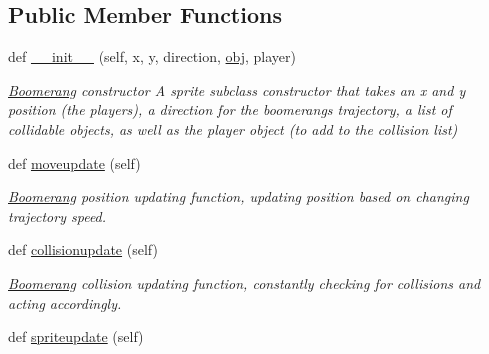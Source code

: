 \subsection*{Public Member Functions}
\begin{DoxyCompactItemize}
\item 
def \hyperlink{classactor_1_1boomerang_1_1_boomerang_a7b20570fa9c54aaba3623075f99770f1}{\+\_\+\+\_\+init\+\_\+\+\_\+} (self, x, y, direction, \hyperlink{classactor_1_1boomerang_1_1_boomerang_a3f28b182298ed6f753bbaa2bacc50287}{obj}, player)
\begin{DoxyCompactList}\small\item\em \hyperlink{classactor_1_1boomerang_1_1_boomerang}{Boomerang} constructor  A sprite subclass constructor that takes an x and y position (the players), a direction for the boomerang\textquotesingle{}s trajectory, a list of collidable objects, as well as the player object (to add to the collision list) \end{DoxyCompactList}\item 
\mbox{\label{classactor_1_1boomerang_1_1_boomerang_a5a0f0c1b4d25b5fa10ecb7b02a4f6b5e}} 
def \hyperlink{classactor_1_1boomerang_1_1_boomerang_a5a0f0c1b4d25b5fa10ecb7b02a4f6b5e}{moveupdate} (self)
\begin{DoxyCompactList}\small\item\em \hyperlink{classactor_1_1boomerang_1_1_boomerang}{Boomerang} position updating function, updating position based on changing trajectory speed. \end{DoxyCompactList}\item 
\mbox{\label{classactor_1_1boomerang_1_1_boomerang_abbfebdf98803c7e4ac69a1a6e251d781}} 
def \hyperlink{classactor_1_1boomerang_1_1_boomerang_abbfebdf98803c7e4ac69a1a6e251d781}{collisionupdate} (self)
\begin{DoxyCompactList}\small\item\em \hyperlink{classactor_1_1boomerang_1_1_boomerang}{Boomerang} collision updating function, constantly checking for collisions and acting accordingly. \end{DoxyCompactList}\item 
\mbox{\label{classactor_1_1boomerang_1_1_boomerang_a8ed616f57acf720fdd4d7bd5702e1684}} 
def \hyperlink{classactor_1_1boomerang_1_1_boomerang_a8ed616f57acf720fdd4d7bd5702e1684}{spriteupdate} (self)

\end{DoxyCompactItemize}
